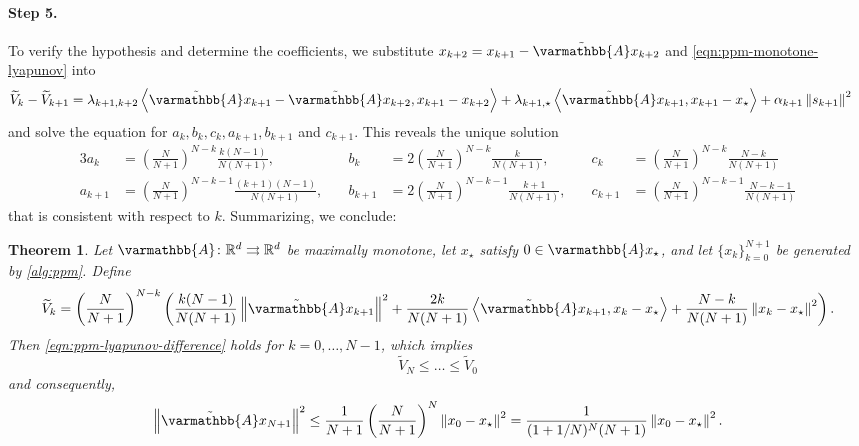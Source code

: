 \documentclass{article}
\theoremstyle{definition}
\theoremstyle{plain}
\newtheorem{theorem}{Theorem}
\newcommand{\reals}{\mathbb{R}}
\newcommand{\opA}{{\varmathbb{A}}}
\newcommand{\inprod}[2]{\left\langle #1,#2 \right\rangle}
\newcommand{\sqnorm}[1]{\left\| #1 \right\|^2}
\newcommand{\topa}{\tilde{\opA}}
\begin{document}
\paragraph{Step 5.}
To verify the hypothesis and determine the coefficients, we substitute $x_{k+2} = x_{k+1} - \topa x_{k+2}$ and \eqref{eqn:ppm-monotone-lyapunov} into 
\begin{align}
\label{eqn:ppm-lyapunov-difference}
\begin{aligned}
    \widetilde{V}_k - \widetilde{V}_{k+1}
    & =
    \lambda_{k+1,k+2}
    \inprod{\topa x_{k+1}-\topa x_{k+2}}{x_{k+1}-x_{k+2}}
    + \lambda_{k+1,\star} \inprod{\topa x_{k+1}}{x_{k+1}-x_\star} + \alpha_{k+1}\sqnorm{s_{k+1}}
\end{aligned}
\end{align}
and solve the equation for $a_k, b_k, c_k, a_{k+1}, b_{k+1}$ and $c_{k+1}$.
This reveals the unique solution 
\begin{alignat*}{3}
    a_k & = \left( \frac{N}{N+1} \right)^{N-k} \frac{k(N-1)}{N(N+1)}, & b_k & = 2\left( \frac{N}{N+1} \right)^{N-k}\frac{k}{N(N+1)} , & c_k & = \left( \frac{N}{N+1} \right)^{N-k}\frac{N-k}{N(N+1)} \\
    a_{k+1} & = \left( \frac{N}{N+1} \right)^{N-k-1} \frac{(k+1)(N-1)}{N(N+1)}, \quad & b_{k+1} & = 2\left( \frac{N}{N+1} \right)^{N-k-1}\frac{k+1}{N(N+1)}, \quad & c_{k+1} & = \left( \frac{N}{N+1} \right)^{N-k-1}\frac{N-k-1}{N(N+1)}
\end{alignat*}
that is consistent with respect to $k$.
Summarizing, we conclude:

\begin{theorem}
\label{theorem:ppm-lyapunov}
Let $\opA\colon\reals^d\rightrightarrows\reals^d$ be maximally monotone, let $x_\star$ satisfy $0\in\opA x_\star$, and let $\{x_k\}_{k=0}^{N+1}$ be generated by \eqref{alg:ppm}.
Define
\[
    \widetilde{V}_k = \left( \frac{N}{N+1} \right)^{N-k} \left( \frac{k(N-1)}{N(N+1)} \sqnorm{\topa x_{k+1}} + \frac{2k}{N(N+1)} \inprod{\topa x_{k+1}}{x_k-x_\star} 
    + \frac{N-k}{N(N+1)} \sqnorm{x_k-x_\star} \right) .
\]
Then \eqref{eqn:ppm-lyapunov-difference} holds for $k=0,\dots,N-1$, which implies
\[
    \widetilde{V}_N \le \dots \le \widetilde{V}_0
\]
and consequently, 
\[
    \sqnorm{\topa x_{N+1}}
    \le \frac{1}{N+1} \left( \frac{N}{N+1} \right)^N \sqnorm{x_0 - x_\star}
    = \frac{1}{(1+1/N)^N(N+1)}\sqnorm{x_0-x_\star}.
\]
\end{theorem}
\end{document}
